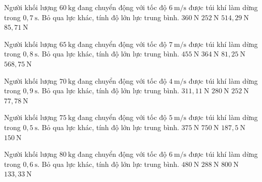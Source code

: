 \begin{ex}
Người khối lượng $60\ \mathrm{kg}$ đang chuyển động với tốc độ $6\ \mathrm{m/s}$ được túi khí làm dừng trong $0,7\ \mathrm{s}$. Bỏ qua lực khác, tính độ lớn lực trung bình.
\choice
{$360\ \mathrm{N}$}
{$252\ \mathrm{N}$}
{\True $514,29\ \mathrm{N}$}
{$85,71\ \mathrm{N}$}
\end{ex}

\begin{ex}
Người khối lượng $65\ \mathrm{kg}$ đang chuyển động với tốc độ $7\ \mathrm{m/s}$ được túi khí làm dừng trong $0,8\ \mathrm{s}$. Bỏ qua lực khác, tính độ lớn lực trung bình.
\choice
{$455\ \mathrm{N}$}
{$364\ \mathrm{N}$}
{$81,25\ \mathrm{N}$}
{\True $568,75\ \mathrm{N}$}
\end{ex}

\begin{ex}
Người khối lượng $70\ \mathrm{kg}$ đang chuyển động với tốc độ $4\ \mathrm{m/s}$ được túi khí làm dừng trong $0,9\ \mathrm{s}$. Bỏ qua lực khác, tính độ lớn lực trung bình.
\choice
{\True $311,11\ \mathrm{N}$}
{$280\ \mathrm{N}$}
{$252\ \mathrm{N}$}
{$77,78\ \mathrm{N}$}
\end{ex}

\begin{ex}
Người khối lượng $75\ \mathrm{kg}$ đang chuyển động với tốc độ $5\ \mathrm{m/s}$ được túi khí làm dừng trong $0,5\ \mathrm{s}$. Bỏ qua lực khác, tính độ lớn lực trung bình.
\choice
{$375\ \mathrm{N}$}
{\True $750\ \mathrm{N}$}
{$187,5\ \mathrm{N}$}
{$150\ \mathrm{N}$}
\end{ex}

\begin{ex}
Người khối lượng $80\ \mathrm{kg}$ đang chuyển động với tốc độ $6\ \mathrm{m/s}$ được túi khí làm dừng trong $0,6\ \mathrm{s}$. Bỏ qua lực khác, tính độ lớn lực trung bình.
\choice
{$480\ \mathrm{N}$}
{$288\ \mathrm{N}$}
{\True $800\ \mathrm{N}$}
{$133,33\ \mathrm{N}$}
\end{ex}

